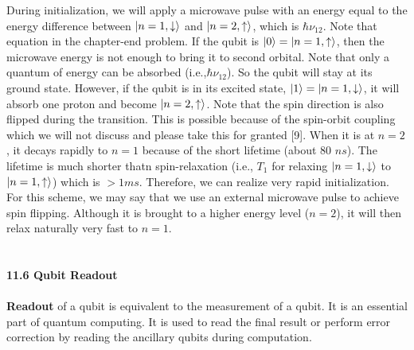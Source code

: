 \documentclass{article}
\begin{document}
During initialization, we will apply a microwave pulse with an energy equal to
the energy difference between $\ket{n=1,\downarrow}$ and $\ket{n=2,\uparrow}$, which is $\hbar \nu_{12}$.
Note that equation in the chapter-end problem. If the qubit is $\ket{0}
=\ket{n=1,\uparrow}$, then the microwave energy is not enough to bring it to 
second orbital. Note that only a quantum of energy can be absorbed (i.e.,$\hbar \nu_{12}$).
So the qubit will stay at its ground state. However, if the qubit is in its excited state, $\ket{1}=\ket{n=1,\downarrow}$,
it will absorb one proton and become $\ket{n=2,\uparrow}$. Note that the spin direction is also flipped 
during the transition. This is possible because of the spin-orbit coupling which we will not
discuss and please take this for granted [9]. When it is at $n=2$, it decays rapidly to $n=1$ because of the
short lifetime (about 80 $ns$). The lifetime is much shorter thatn spin-relaxation (i.e., $T_1$ for relaxing
$\ket{n=1,\downarrow}$ to $\ket{n=1,\uparrow}$) which is $>1 ms$. Therefore, we can realize very rapid initialization.
For this scheme, we may say that we use an external microwave pulse to achieve spin flipping. Although
it is brought to a higher energy level ($n=2$), it will then relax naturally very fast to $n=1$.\\\\\\
\textbf{\large 11.6 Qubit Readout}\\\\
\textbf{Readout} of a qubit is equivalent to the measurement of a qubit. It is an essential part of
quantum computing. It is used to read the final result or perform error correction by reading the ancillary qubits
during computation.
\end{document}
